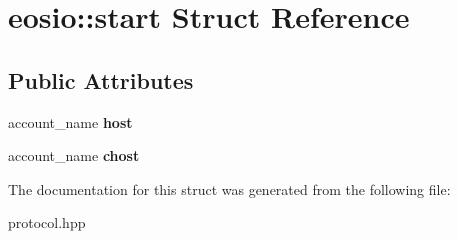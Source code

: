 \hypertarget{structeosio_1_1start}{}\section{eosio\+:\+:start Struct Reference}
\label{structeosio_1_1start}
\subsection*{Public Attributes}
\begin{DoxyCompactItemize}
\item 
\mbox{\label{structeosio_1_1start_a5daf6caa629f4922ebdaa72e67b88968}} 
account\+\_\+name {\bfseries host}
\item 
\mbox{\label{structeosio_1_1start_ac13a51bfab2ea4f6522c93380c774233}} 
account\+\_\+name {\bfseries chost}
\end{DoxyCompactItemize}


The documentation for this struct was generated from the following file\+:\begin{DoxyCompactItemize}
\item 
protocol.\+hpp\end{DoxyCompactItemize}
